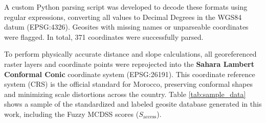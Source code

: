 \documentclass[11pt,twocolumn,a4paper]{article}
\begin{document}
A custom Python parsing script was developed to decode these formats using regular expressions, converting all values to Decimal Degrees in the WGS84 datum (EPSG:4326). Geosites with missing names or unparseable coordinates were flagged. In total, 371 coordinates were successfully parsed.

To perform physically accurate distance and slope calculations, all georeferenced raster layers and coordinate points were reprojected into the \textbf{Sahara Lambert Conformal Conic} coordinate system (EPSG:26191). This coordinate reference system (CRS) is the official standard for Morocco, preserving conformal shapes and minimizing scale distortions across the country. Table \ref{tab:sample_data} shows a sample of the standardized and labeled geosite database generated in this work, including the Fuzzy MCDSS scores ($S_{\text{access}}$).

\begin{table}[t]
    \centering
    \caption{Extract of the compiled and labeled Moroccan geosites dataset showing all physical and road features, fuzzy membership scores ($S_{\text{access}}$), and accessibility tiers (5 sample records)}
    \label{tab:sample_data}
\end{table}
\end{document}
